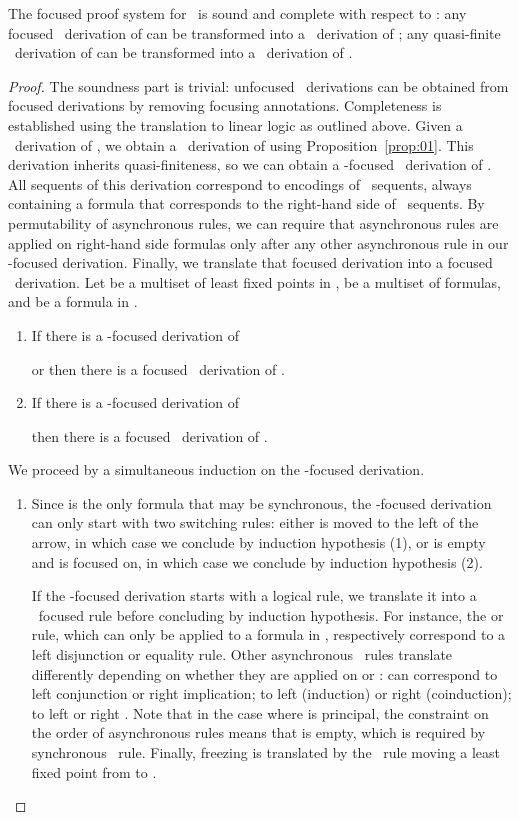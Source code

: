 \begin{proposition}
The focused proof system for \muLJL\ is sound and complete
with respect to \muLJL:
any focused \muLJL\ derivation of 
can be transformed into a \muLJL\ derivation of ;
any quasi-finite \muLJL\ derivation of 
can be transformed into a \muLJL\ derivation of .
\end{proposition}

\begin{proof}
The soundness part is trivial: unfocused \muLJL\ derivations can be
obtained from focused derivations by removing focusing annotations.
Completeness is established using the translation to linear logic
as outlined above.
Given a \muLJL\ derivation of ,
we obtain a \mumall\ derivation of  using
Proposition~\ref{prop:01}.
This derivation inherits quasi-finiteness,
so we can obtain a -focused \mumall\ derivation
of .
All sequents of this derivation correspond to encodings of \muLJL\ sequents,
always containing a formula that corresponds to the right-hand side
of \muLJL\ sequents.
By permutability of asynchronous rules,
we can require that asynchronous rules are applied on right-hand side
formulas only after any other asynchronous rule in our -focused derivation.
Finally, we translate that focused derivation into a focused
\muLJL\ derivation.
Let  be a multiset of least fixed points in ,
 be a multiset of  formulas,
and  be a formula in .
\begin{enumerate}
\item
  If there is a -focused derivation of
  
  or 
  then there is a focused \muLJL\ derivation of
  .
\item
  If there is a -focused derivation of
  
  then there is a focused \muLJL\ derivation of .
\end{enumerate}
We proceed by a simultaneous induction on the -focused derivation.
\begin{enumerate}
\item
  Since  is the only formula that may be synchronous,
  the -focused derivation can only start with two switching rules:
  either  is moved to the left of the arrow, in which case
  we conclude by induction hypothesis (1),
  or  is empty and  is focused on, in which case
  we conclude by induction hypothesis (2).

  If the -focused derivation starts with a logical rule,
  we translate it into a \muLJL\ focused rule before concluding by
  induction hypothesis.
  For instance, the  or  rule, which can only be
  applied to a formula in , respectively correspond
  to a left disjunction or equality rule.
  Other asynchronous \mumall\ rules translate differently depending
  on whether they are applied on  or :
   can correspond to left conjunction or right implication;
   to left  (induction) or right  (coinduction);
   to left  or right .
  Note that in the case where  is principal, the constraint on
  the order of asynchronous rules means that  is empty,
  which is required by synchronous \muLJL\ rule.
  Finally, freezing is translated by the \muLJL\ rule
  moving a least fixed point from  to .


\end{enumerate}
\end{proof}
